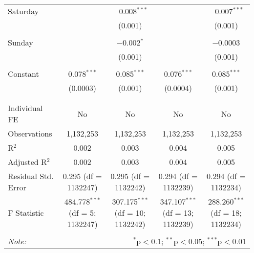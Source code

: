\documentclass[
]{article}
\begin{document}
\begin{table}[!htbp]
{\begin{tabular}{@{\extracolsep{5pt}}lcccc}
 Saturday &  & $-$0.008$^{***}$ &  & $-$0.007$^{***}$ \\ 
  &  & (0.001) &  & (0.001) \\ 
  & & & & \\ 
 Sunday &  & $-$0.002$^{*}$ &  & $-$0.0003 \\ 
  &  & (0.001) &  & (0.001) \\ 
  & & & & \\ 
 Constant & 0.078$^{***}$ & 0.085$^{***}$ & 0.076$^{***}$ & 0.085$^{***}$ \\ 
  & (0.0003) & (0.001) & (0.0004) & (0.001) \\ 
  & & & & \\ 
\hline \\[-1.8ex] 
Individual FE & No & No & No & No \\ 
Observations & 1,132,253 & 1,132,253 & 1,132,253 & 1,132,253 \\ 
R$^{2}$ & 0.002 & 0.003 & 0.004 & 0.005 \\ 
Adjusted R$^{2}$ & 0.002 & 0.003 & 0.004 & 0.005 \\ 
Residual Std. Error & 0.295 (df = 1132247) & 0.295 (df = 1132242) & 0.294 (df = 1132239) & 0.294 (df = 1132234) \\ 
F Statistic & 484.778$^{***}$ (df = 5; 1132247) & 307.175$^{***}$ (df = 10; 1132242) & 347.107$^{***}$ (df = 13; 1132239) & 288.260$^{***}$ (df = 18; 1132234) \\ 
\hline 
\hline \\[-1.8ex] 
\textit{Note:}  & \multicolumn{4}{r}{$^{*}$p$<$0.1; $^{**}$p$<$0.05; $^{***}$p$<$0.01} \\ 
\end{tabular}
} 
\end{table} 
\newpage
\end{document}
